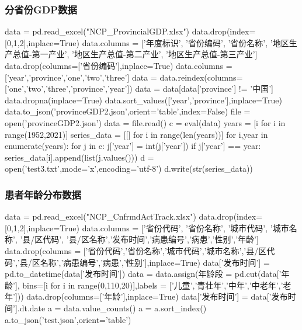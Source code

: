 \documentclass{ctexart}
\begin{document}
\subsubsection{分省份GDP数据}
\begin{python}
data = pd.read_excel("NCP_ProvincialGDP.xlsx")
data.drop(index=[0,1,2],inplace=True)
data.columns = ['年度标识', '省份编码', '省份名称', '地区生产总值-第一产业', '地区生产总值-第二产业', '地区生产总值-第三产业']
data.drop(columns=['省份编码'],inplace=True)
data.columns = ['year','province','one','two','three']
data = data.reindex(columns=['one','two','three','province','year']) 
data = data[data['province'] != '中国']
data.dropna(inplace=True)
data.sort_values(['year','province'],inplace=True)
data.to_json('provinceGDP2.json',orient='table',index=False)
file = open('provinceGDP2.json')
data = file.read()
c = eval(data)
years = [i for i in range(1952,2021)]
series_data = [[] for i in range(len(years))]
for i,year in enumerate(years):
    for j in c:
        j['year'] = int(j['year'])
        if j['year'] == year:
            series_data[i].append(list(j.values()))
d = open('test3.txt',mode='x',encoding='utf-8')
d.write(str(series_data))
\end{python}
\subsubsection{患者年龄分布数据}
\begin{python}
data = pd.read_excel("NCP_CnfrmdActTrack.xlsx")
data.drop(index=[0,1,2],inplace=True)
data.columns = ['省份代码', '省份名称', '城市代码', '城市名称', '县/区代码', '县/区名称','发布时间','病患编号','病患','性别','年龄']
data.drop(columns = ['省份代码','省份名称','城市代码','城市名称','县/区代码','县/区名称','病患编号','病患','性别'],inplace=True)
data['发布时间'] = pd.to_datetime(data['发布时间'])
data = data.assign(年龄段 = pd.cut(data['年龄'], bins=[i for i in range(0,110,20)],labels = ['儿童','青壮年','中年','中老年','老年']))
data.drop(columns=['年龄'],inplace=True)
data['发布时间'] = data['发布时间'].dt.date
a = data.value_counts()
a = a.sort_index()
a.to_json('test.json',orient='table')
\end{python}
\end{document}
